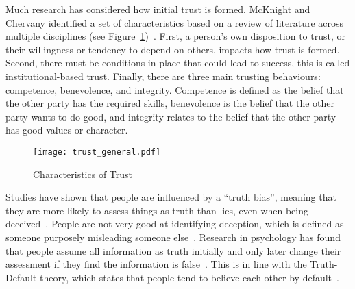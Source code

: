 \documentclass{article}
\newcommand{\brendan}[1]{\textcolor{blue}{}}
\begin{document}
\brendan{It'd be great/ importnat and consistent for us to  address trust from a cultural perspective and in particular Mātauranga Maori. I'm thinking this through the cultural anthropology lens. Getting along not only requires thinking about the differences between cultures, but also the differences between persons as kin, as strangers and other forms of relatedness. These differences are altered through culture, questions of trust, intimacy and the modes through which others are framed. I see Maui's writtne  apaper on some of this https://digitalcouncil.govt.nz/assets/Uploads/Maori-Perspectives-on-Trust-and-Automated-Decision-Making-13-Nov-2020-1.pdf}

Much research has considered how initial trust is formed. McKnight and Chervany identified a set of characteristics based on a review of literature across multiple disciplines (see Figure~\ref{fig:trust_general})~\cite{mcknight2001trust}. First, a person's own disposition to trust, or their willingness or tendency to depend on others, impacts how trust is formed. Second, there must be conditions in place that could lead to success, this is called institutional-based trust. Finally, there are three main trusting behaviours: competence, benevolence, and integrity. 
Competence is defined as the belief that the other party has the required skills, benevolence is the belief that the other party wants to do good, and integrity relates to the belief that the other party has good values or character. 

\begin{figure}
    \centering
    \texttt{[image: trust\_general.pdf]}
    \caption{Characteristics of Trust~\cite{riegelsberger2005mechanics}}
    \label{fig:trust_general}
\end{figure}

Studies have shown that people are influenced by a ``truth bias'', meaning that they are more likely to assess things as truth than lies, even when being deceived~\cite{mccornack1986deception, zuckerman1981verbal, zuckerman1984anchoring}.
People are not very good at identifying deception, which is defined as someone purposely misleading someone else~\cite{levine1999accuracy}. Research in psychology has found that people assume all information as truth initially and only later change their assessment if they find the information is false~\cite{gilbert1990unbelieving}. This is in line with the Truth-Default theory, which states that people tend to believe each other by default~\cite{levine2014truth}.
\end{document}

